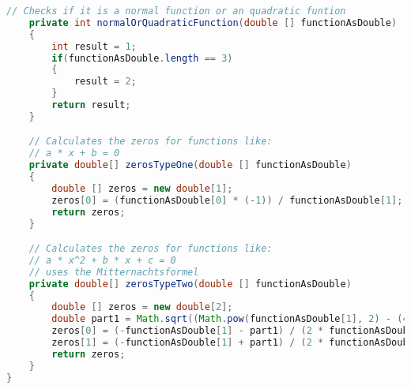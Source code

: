 \begin{lstlisting}[caption=Zeros (Keienburg),label=list:Zeros,language=Java]
    // Checks if it is a normal function or an quadratic funtion
    private int normalOrQuadraticFunction(double [] functionAsDouble)
    {
        int result = 1;
        if(functionAsDouble.length == 3)
        {
            result = 2;
        }
        return result;
    }

    // Calculates the zeros for functions like:
    // a * x + b = 0
    private double[] zerosTypeOne(double [] functionAsDouble)
    {
        double [] zeros = new double[1];
        zeros[0] = (functionAsDouble[0] * (-1)) / functionAsDouble[1];
        return zeros;
    }

    // Calculates the zeros for functions like:
    // a * x^2 + b * x + c = 0
    // uses the Mitternachtsformel
    private double[] zerosTypeTwo(double [] functionAsDouble)
    {
        double [] zeros = new double[2];
        double part1 = Math.sqrt((Math.pow(functionAsDouble[1], 2) - (4 * functionAsDouble[2] * functionAsDouble[0])));
        zeros[0] = (-functionAsDouble[1] - part1) / (2 * functionAsDouble[2]);
        zeros[1] = (-functionAsDouble[1] + part1) / (2 * functionAsDouble[2]);
        return zeros;
    }
}
\end{lstlisting}    

